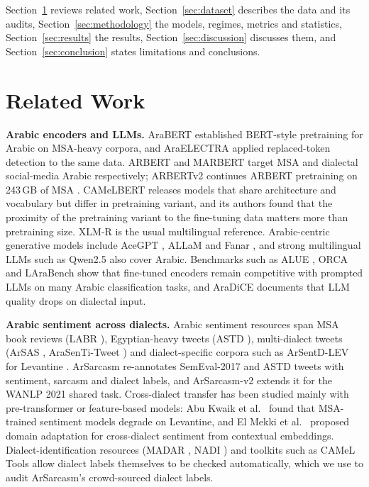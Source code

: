 \documentclass[11pt]{article}
\begin{document}
Section~\ref{sec:related_work} reviews related work, Section~\ref{sec:dataset} describes the data and its audits, Section~\ref{sec:methodology} the models, regimes, metrics and statistics, Section~\ref{sec:results} the results, Section~\ref{sec:discussion} discusses them, and Section~\ref{sec:conclusion} states limitations and conclusions.

\section{Related Work}
\label{sec:related_work}
\textbf{Arabic encoders and LLMs.} AraBERT \cite{antoun2020arabert} established BERT-style pretraining for Arabic on MSA-heavy corpora, and AraELECTRA \cite{antoun2021araelectra} applied replaced-token detection to the same data. ARBERT and MARBERT \cite{abdulmageed2021arbert} target MSA and dialectal social-media Arabic respectively; ARBERTv2 continues ARBERT pretraining on 243\,GB of MSA \cite{elmadany2023orca}. CAMeLBERT \cite{inoue2021interplay} releases models that share architecture and vocabulary but differ in pretraining variant, and its authors found that the proximity of the pretraining variant to the fine-tuning data matters more than pretraining size. XLM-R \cite{conneau2020xlmr} is the usual multilingual reference. Arabic-centric generative models include AceGPT \cite{huang2024acegpt}, ALLaM \cite{bari2025allam} and Fanar \cite{fanar2025}, and strong multilingual LLMs such as Qwen2.5 \cite{qwen2025qwen25} also cover Arabic. Benchmarks such as ALUE \cite{seelawi2021alue}, ORCA \cite{elmadany2023orca} and LAraBench \cite{abdelali2024larabench} show that fine-tuned encoders remain competitive with prompted LLMs on many Arabic classification tasks, and AraDiCE \cite{mousi2025aradice} documents that LLM quality drops on dialectal input.

\textbf{Arabic sentiment across dialects.} Arabic sentiment resources span MSA book reviews (LABR \cite{aly2013labr}), Egyptian-heavy tweets (ASTD \cite{nabil2015astd}), multi-dialect tweets (ArSAS \cite{elmadany2018arsas}, AraSenTi-Tweet \cite{altwairesh2017arasenti}) and dialect-specific corpora such as ArSentD-LEV for Levantine \cite{baly2018arsentdlev}. ArSarcasm \cite{abufarha2020arsarcasm} re-annotates SemEval-2017 and ASTD tweets with sentiment, sarcasm and dialect labels, and ArSarcasm-v2 \cite{abufarha2021arsarcasmv2} extends it for the WANLP 2021 shared task. Cross-dialect transfer has been studied mainly with pre-transformer or feature-based models: Abu Kwaik et al.\ \cite{abukwaik2019} found that MSA-trained sentiment models degrade on Levantine, and El Mekki et al.\ \cite{elmekki2021} proposed domain adaptation for cross-dialect sentiment from contextual embeddings. Dialect-identification resources (MADAR \cite{bouamor2018madar}, NADI \cite{abdulmageed2020nadi,ref13}) and toolkits such as CAMeL Tools \cite{obeid2020cameltools} allow dialect labels themselves to be checked automatically, which we use to audit ArSarcasm's crowd-sourced dialect labels.
\end{document}
